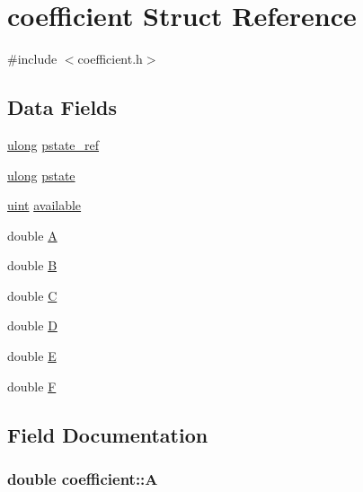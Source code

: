 \hypertarget{structcoefficient}{}\section{coefficient Struct Reference}
\label{structcoefficient}


{\ttfamily \#include $<$coefficient.\+h$>$}

\subsection*{Data Fields}
\begin{DoxyCompactItemize}
\item 
\hyperlink{generic_8h_a718b4eb2652c286f4d42dc18a8e71a1a}{ulong} \hyperlink{structcoefficient_af9f59f76144099c646a2a0b7e621a0ad}{pstate\+\_\+ref}
\item 
\hyperlink{generic_8h_a718b4eb2652c286f4d42dc18a8e71a1a}{ulong} \hyperlink{structcoefficient_a8925983fbabe494fd60712bf1b3450a7}{pstate}
\item 
\hyperlink{generic_8h_a91ad9478d81a7aaf2593e8d9c3d06a14}{uint} \hyperlink{structcoefficient_ad13424d49390d1e8d1f735924d8ee680}{available}
\item 
double \hyperlink{structcoefficient_a780ff954a477f5081a13cdef91b25136}{A}
\item 
double \hyperlink{structcoefficient_ae62013507d3ff686bb722fcbe07b40c7}{B}
\item 
double \hyperlink{structcoefficient_ae9dfad78bed355bede21fa82fc844653}{C}
\item 
double \hyperlink{structcoefficient_a704078b49bbd47f39b1d74c8955a3895}{D}
\item 
double \hyperlink{structcoefficient_a17b580c4429bdf0e9864ee3f0e24db17}{E}
\item 
double \hyperlink{structcoefficient_a53becc3d26c6e1ac77f25002c28b5971}{F}
\end{DoxyCompactItemize}


\subsection{Field Documentation}
\subsubsection[{\texorpdfstring{A}{A}}]{\setlength{\rightskip}{0pt plus 5cm}double coefficient\+::A}\hypertarget{structcoefficient_a780ff954a477f5081a13cdef91b25136}{}\label{structcoefficient_a780ff954a477f5081a13cdef91b25136}
